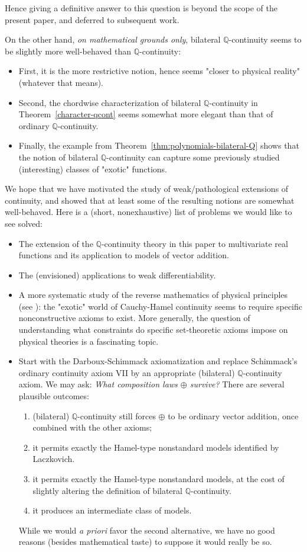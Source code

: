 \documentclass[11pt]{amsart} %
\theoremstyle{definition}
\newcommand{\Q}{\mathbb{Q}}
\begin{document}
Hence giving a definitive answer to this question is beyond the scope of the present paper, and deferred to subsequent work. 

On the other hand, \emph{on mathematical grounds only}, bilateral $\Q$-continuity seems to be slightly more well-behaved than $\Q$-continuity: 
\begin{itemize} 
\item[-] First, it is the more restrictive notion, hence seems "closer to physical reality" (whatever that means).   
\item[-] Second, the chordwise characterization of bilateral $\Q$-continuity in Theorem~\ref{character-qcont} seems somewhat more elegant than that of ordinary $\Q$-continuity. 
\item[-] Finally, the example from Theorem~\ref{thm:polynomials-bilateral-Q} shows that the notion of bilateral $\Q$-continuity can capture some previously studied (interesting) classes of "exotic" functions. 
\end{itemize} 

We hope that we have motivated the study of weak/pathological extensions of continuity, and showed that at least some of the resulting notions are somewhat well-behaved. Here is a (short, nonexhaustive) list of problems we would like to see solved: 
\begin{itemize} 
\item[-] The extension of the $\Q$-continuity theory in this paper to multivariate real functions and its application to models of vector addition. 
\item[-] The (envisioned) applications to weak differentiability. 
\item[-] A more systematic study of the reverse mathematics of physical principles (see \cite{38,39}):  the "exotic" world of Cauchy-Hamel continuity seems to require specific nonconstructive axioms to exist. More generally, the question of understanding what constraints do specific set-theoretic axioms impose on physical theories is a fascinating topic. 
\item[-] Start with the Darboux-Schimmack axiomatization and replace Schimmack's ordinary continuity axiom VII by an appropriate (bilateral) $\Q$-continuity axiom. We may ask: \emph{What composition laws  $\oplus$  survive?} There are several plausible outcomes:
\begin{enumerate} 
\item (bilateral) $\Q$-continuity still forces $\oplus$ to be ordinary vector addition, once combined with the other axioms;
\item it permits exactly the Hamel-type nonstandard models identified by Laczkovich. 
\item it permits exactly the Hamel-type nonstandard models, at the cost of slightly altering the definition of bilateral $\Q$-continuity. 
\item it produces an intermediate class of models.
\end{enumerate} 
While we would \emph{a priori} favor the second alternative, we have no good reasons (besides mathematical taste) to suppose it would really be so. 
\end{itemize} 
\end{document}
